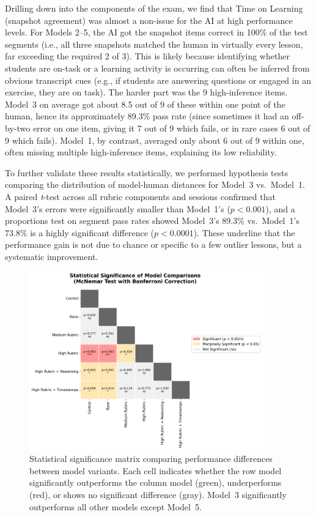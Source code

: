 \documentclass[12pt]{article}
\begin{document}
Drilling down into the components of the exam, we find that Time on Learning (snapshot agreement) was almost a non-issue for the AI at high performance levels. For Models 2–5, the AI got the snapshot items correct in 100\% of the test segments (i.e., all three snapshots matched the human in virtually every lesson, far exceeding the required 2 of 3). This is likely because identifying whether students are on-task or a learning activity is occurring can often be inferred from obvious transcript cues (e.g., if students are answering questions or engaged in an exercise, they are on task). The harder part was the 9 high-inference items. Model~3 on average got about 8.5 out of 9 of these within one point of the human, hence its approximately 89.3\% pass rate (since sometimes it had an off-by-two error on one item, giving it 7 out of 9 which fails, or in rare cases 6 out of 9 which fails). Model~1, by contrast, averaged only about 6 out of 9 within one, often missing multiple high-inference items, explaining its low reliability.

To further validate these results statistically, we performed hypothesis tests comparing the distribution of model-human distances for Model~3 vs.\ Model~1. A paired \textit{t}-test across all rubric components and sessions confirmed that Model~3's errors were significantly smaller than Model~1's (\(p < 0.001\)), and a proportions test on segment pass rates showed Model~3's 89.3\% vs.\ Model~1's 73.8\% is a highly significant difference (\(p < 0.0001\)). These underline that the performance gain is not due to chance or specific to a few outlier lessons, but a systematic improvement.

\begin{figure}[t]\centering
\includegraphics[width=0.9\textwidth]{statistical_significance_matrix.png}
\caption{Statistical significance matrix comparing performance differences between model variants. Each cell indicates whether the row model significantly outperforms the column model (green), underperforms (red), or shows no significant difference (gray). Model~3 significantly outperforms all other models except Model~5.}
\label{fig:stat-sig}
\end{figure}
\end{document}
